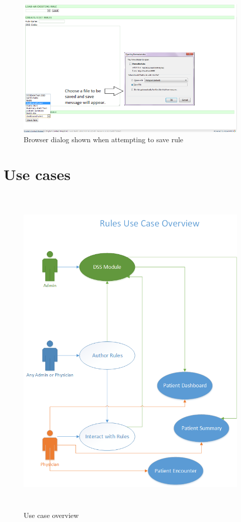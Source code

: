 \documentclass[12pt,letterpaper]{article}
\begin{document}
\begin{figure}\begin{center}
\includegraphics[width=6.5in]{user_guide/save_rule_dialog.png}
\end{center}
\caption{Browser dialog shown when attempting to save rule}
\label{fig:SAVE_RULE_DIALOG}
\end{figure}

\newpage 
\section{Use cases} \label{sec:USE_CASES}

\begin{figure}\begin{center}
\includegraphics[height=6.5in]{use_case_overview.png}
\end{center}
\caption{Use case overview}
\label{fig:USE_CASE_OVERVIEW}
\end{figure}
\end{document}
